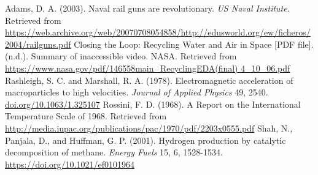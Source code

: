 \documentclass[a4paper]{article}
\begin{document}
\newpage
\begin{thebibliography}{5} %
Adams, D. A. (2003). Naval rail guns are revolutionary. \textit{US Naval Institute}. Retrieved from \url{https://web.archive.org/web/20070708054858/http://edusworld.org/ew/ficheros/2004/railguns.pdf}
Closing the Loop: Recycling Water and Air in Space [PDF file]. (n.d.). Summary of inaccessible video. NASA. Retrieved from \url{https://www.nasa.gov/pdf/146558main_RecyclingEDA(final) 4_10_06.pdf}
Rashleigh, S. C. and Marshall, R. A. (1978). Electromagnetic acceleration of macroparticles to high velocities. \textit{Journal of Applied Physics} 49, 2540. \url{doi.org/10.1063/1.325107}	
Rossini, F. D. (1968). A Report on the International Temperature Scale of 1968. Retrieved from \url{http://media.iupac.org/publications/pac/1970/pdf/2203x0555.pdf}
Shah, N., Panjala, D., and Huffman, G. P. (2001). Hydrogen production by catalytic decomposition of methane. \textit{Energy Fuels} 15, 6, 1528-1534. \url{https://doi.org/10.1021/ef0101964}
\end{thebibliography}
\end{document}

